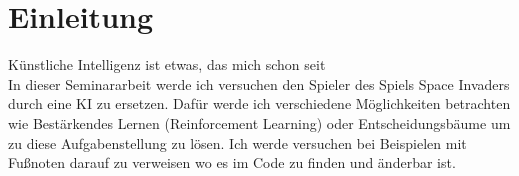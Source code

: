 \chapter{Einleitung}
Künstliche Intelligenz ist etwas, das mich schon seit \\
In dieser Seminararbeit werde ich versuchen den Spieler des Spiels Space Invaders durch eine KI zu ersetzen. Dafür werde ich  verschiedene Möglichkeiten betrachten wie Bestärkendes Lernen (Reinforcement Learning) oder Entscheidungsbäume um zu diese Aufgabenstellung zu lösen. Ich werde versuchen bei Beispielen mit Fußnoten darauf zu verweisen wo es im Code zu finden und änderbar ist.